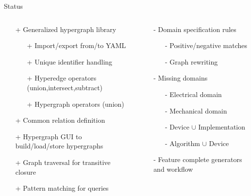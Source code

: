 \documentclass[pdf]
{beamer}
\begin{document}
\begin{frame}{Status}
    \begin{columns}[t]
    	\begin{column}{.5\textwidth}
    		\begin{itemize}
    		\item[+] Generalized hypergraph library
    			\begin{itemize}
    			\item[+] Import/export from/to YAML
    			\item[+] Unique identifier handling
    			\item[+] Hyperedge operators (union,intersect,subtract)
    			\item[+] Hypergraph operators (union)
    			\end{itemize}
            \item[+] Common relation definition
    		\item[+] Hypergraph GUI to build/load/store hypergraphs
            \item[+] Graph traversal for transitive closure
            \item[+] Pattern matching for queries
    		\end{itemize}
    	\end{column}
    	\begin{column}{.5\textwidth}
    		\begin{itemize}
            \item[-] Domain specification rules
    			\begin{itemize}
                \item[-] Positive/negative matches
                \item[-] Graph rewriting
    			\end{itemize}
            \item[-] Missing domains
    			\begin{itemize}
                \item[-] Electrical domain
                \item[-] Mechanical domain
                \item[-] Device $\cup$ Implementation
                \item[-] Algorithm $\cup$ Device
    			\end{itemize}
    		\item[-] Feature complete generators and workflow
    		\end{itemize}
    	\end{column}
    \end{columns}
\end{frame}
\end{document}
